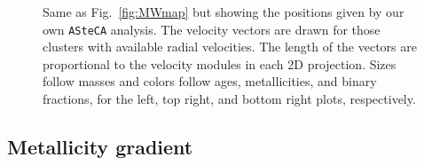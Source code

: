\documentclass{aa}
\begin{document}
  \begin{figure}
   \caption{Same as Fig.~\ref{fig:MWmap} but showing the positions given by our
   own \texttt{ASteCA} analysis. The velocity vectors are drawn for those
   clusters with available radial velocities. The length of the vectors are
   proportional to the velocity modules in each 2D projection. Sizes follow
   masses and colors follow ages, metallicities, and binary fractions, for the
   left, top right, and bottom right plots, respectively. }
   \label{fig:MWmap_vectors}
  \end{figure}






 \subsection{Metallicity gradient}
  \label{ssec:met_gradient}

\end{document}
